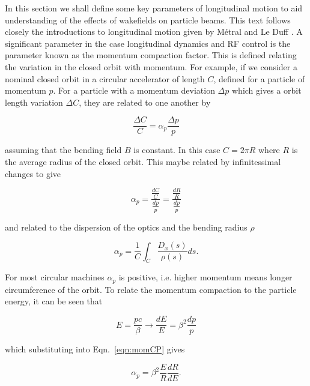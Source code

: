 \label{app:long_motion}

In this section we shall define some key parameters of longitudinal motion to aid understanding of the effects of wakefields on particle beams. This text follows closely the introductions to longitudinal motion given by Métral \cite{Metral:LongDyn} and Le Duff \cite{Leduff:LongDyn}. A significant parameter in the case longitudinal dynamics and RF control is the parameter known as the momentum compaction factor. This is defined relating the variation in the closed orbit with momentum. For example, if we consider a nominal closed orbit in a circular accelerator of length $C$, defined for a particle of momentum $p$. For a particle with a momentum deviation $\Delta p$ which gives a orbit length variation $\Delta C$, they are related to one another by

\begin{equation}
\frac{\Delta C}{C} = \alpha_{p} \frac{\Delta p}{p}
\end{equation}

assuming that the bending field $B$ is constant. In this case $C=2\pi R$ where $R$ is the average radius of the closed orbit. This maybe related by infinitessimal changes to give

\begin{equation}
\alpha_{p} = \frac{\frac{dC}{C}}{\frac{dp}{p}} = \frac{\frac{dR}{R}}{\frac{dp}{p}}
\label{eqn:momCP}
\end{equation}

and related to the dispersion of the optics and the bending radius $\rho$

\begin{equation}
\alpha_{p} = \frac{1}{C}\int_{C}\frac{D_{x} \left( s \right)}{\rho\left( s \right)} ds.
\end{equation}

For most circular machines $\alpha_{p}$ is positive, i.e. higher momentum means longer circumference of the orbit. To relate the momentum compaction to the particle energy, it can be seen that 

\begin{equation}
E = \frac{pc}{\beta} \rightarrow \frac{dE}{E} = \beta^{2}\frac{dp}{p}
\end{equation}

which substituting into Eqn.~\ref{eqn:momCP} gives

\begin{equation}
\alpha_{p} = \beta^{2}\frac{E}{R}\frac{dR}{dE}.
\end{equation}


